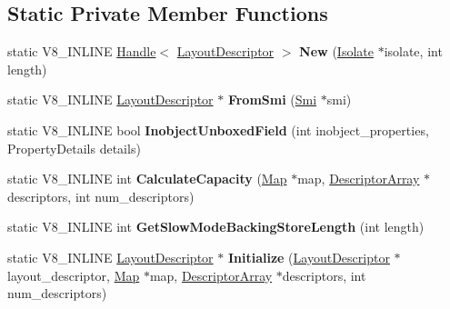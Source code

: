 \subsection*{Static Private Member Functions}
\begin{DoxyCompactItemize}
\item 
static V8\+\_\+\+I\+N\+L\+I\+NE \hyperlink{classv8_1_1internal_1_1_handle}{Handle}$<$ \hyperlink{classv8_1_1internal_1_1_layout_descriptor}{Layout\+Descriptor} $>$ {\bfseries New} (\hyperlink{classv8_1_1internal_1_1_isolate}{Isolate} $\ast$isolate, int length)\hypertarget{classv8_1_1internal_1_1_layout_descriptor_ac5a37c42596bf3f346c9c3421066fdfe}{}\label{classv8_1_1internal_1_1_layout_descriptor_ac5a37c42596bf3f346c9c3421066fdfe}

\item 
static V8\+\_\+\+I\+N\+L\+I\+NE \hyperlink{classv8_1_1internal_1_1_layout_descriptor}{Layout\+Descriptor} $\ast$ {\bfseries From\+Smi} (\hyperlink{classv8_1_1internal_1_1_smi}{Smi} $\ast$smi)\hypertarget{classv8_1_1internal_1_1_layout_descriptor_a8062e51a710c4e6a43c7ae1ba3201c83}{}\label{classv8_1_1internal_1_1_layout_descriptor_a8062e51a710c4e6a43c7ae1ba3201c83}

\item 
static V8\+\_\+\+I\+N\+L\+I\+NE bool {\bfseries Inobject\+Unboxed\+Field} (int inobject\+\_\+properties, Property\+Details details)\hypertarget{classv8_1_1internal_1_1_layout_descriptor_a489bf378870efe89eacaf31c06fdbb23}{}\label{classv8_1_1internal_1_1_layout_descriptor_a489bf378870efe89eacaf31c06fdbb23}

\item 
static V8\+\_\+\+I\+N\+L\+I\+NE int {\bfseries Calculate\+Capacity} (\hyperlink{classv8_1_1internal_1_1_map}{Map} $\ast$map, \hyperlink{classv8_1_1internal_1_1_descriptor_array}{Descriptor\+Array} $\ast$descriptors, int num\+\_\+descriptors)\hypertarget{classv8_1_1internal_1_1_layout_descriptor_abde063a6f286017709fd548b770227a1}{}\label{classv8_1_1internal_1_1_layout_descriptor_abde063a6f286017709fd548b770227a1}

\item 
static V8\+\_\+\+I\+N\+L\+I\+NE int {\bfseries Get\+Slow\+Mode\+Backing\+Store\+Length} (int length)\hypertarget{classv8_1_1internal_1_1_layout_descriptor_a0918c76c5701bee6709d73210547e9d3}{}\label{classv8_1_1internal_1_1_layout_descriptor_a0918c76c5701bee6709d73210547e9d3}

\item 
static V8\+\_\+\+I\+N\+L\+I\+NE \hyperlink{classv8_1_1internal_1_1_layout_descriptor}{Layout\+Descriptor} $\ast$ {\bfseries Initialize} (\hyperlink{classv8_1_1internal_1_1_layout_descriptor}{Layout\+Descriptor} $\ast$layout\+\_\+descriptor, \hyperlink{classv8_1_1internal_1_1_map}{Map} $\ast$map, \hyperlink{classv8_1_1internal_1_1_descriptor_array}{Descriptor\+Array} $\ast$descriptors, int num\+\_\+descriptors)\hypertarget{classv8_1_1internal_1_1_layout_descriptor_ac1b3b277fa5994f99096c95dd5898c97}{}\label{classv8_1_1internal_1_1_layout_descriptor_ac1b3b277fa5994f99096c95dd5898c97}


\end{DoxyCompactItemize}
